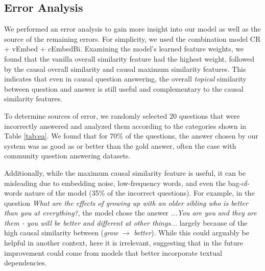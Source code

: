 \subsection{Error Analysis}
\label{sec:erroranalysis}

We performed an error analysis to gain more insight into our model as well as the source of the remaining errors.  For simplicity, we used the combination model CR + vEmbed + cEmbedBi. Examining the model's learned feature weights, we found that the vanilla overall similarity feature had the highest weight, followed by the causal overall similarity and causal maximum similarity features.  This indicates that even in causal question answering, the overall \emph{topical} similarity between question and answer is still useful and complementary to the causal similarity features.


To determine sources of error, we randomly selected 20 questions that were incorrectly answered and analyzed them according to the categories shown in Table \ref{tab:ea}.  We found that for 70\% of the questions, the answer chosen by our system was as good as or better than the gold answer, often the case with community question answering datasets.


Additionally, while the maximum causal similarity feature is useful, it can be misleading due to embedding noise, low-frequency words, and even the bag-of-words nature of the model (35\% of the incorrect questions).  For example, in the question \emph{What are the effects of growing up with an older sibling who is better than you at everything?}, the model chose the answer \emph{...You are you and they are them - you will be better and different at other things...}  largely because of the high causal similarity between (\emph{grow} $\rightarrow$ \emph{better}).  While this could arguably be helpful in another context, here it is irrelevant, suggesting that in the future improvement could come from models that better incorporate textual dependencies.





